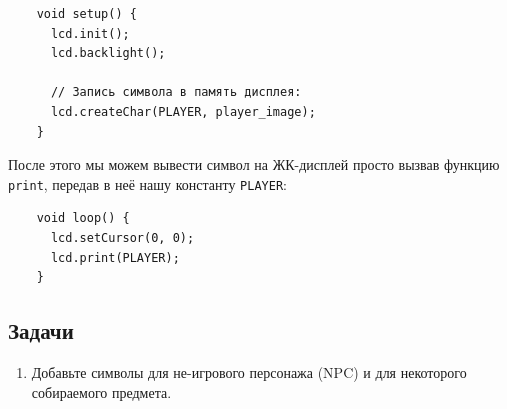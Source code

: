 \documentclass[../sparc.tex]{subfiles}
\begin{document}
\begin{listing}[H]
  \begin{verbatim}
    void setup() {
      lcd.init();
      lcd.backlight();

      // Запись символа в память дисплея:
      lcd.createChar(PLAYER, player_image);
    }
  \end{verbatim}
  \caption{Запись собственного символа в память ЖК-дисплея.}
  \label{listing:game-dev-lcd-create-char}
\end{listing}

После этого мы можем вывести символ на ЖК-дисплей просто вызвав функцию
\texttt{print}, передав в неё нашу константу \texttt{PLAYER}:

\begin{listing}[H]
  \begin{verbatim}
    void loop() {
      lcd.setCursor(0, 0);
      lcd.print(PLAYER);
    }
  \end{verbatim}
  \caption{Вывод собственного символа на экран ЖК-дисплея.}
  \label{listing:game-dev-lcd-print-custom-symbol}
\end{listing}

\subsection{Задачи}
\begin{enumerate}
\item Добавьте символы для не-игрового персонажа (\gls{NPC}) и для некоторого
  собираемого предмета.
\end{enumerate}
\end{document}
